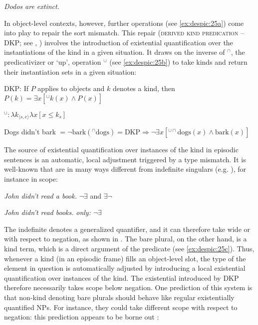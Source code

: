\documentclass[output=paper,
modfonts
]{langscibook}
\begin{document}
	\ea \label{ex:despic:24}
	\textit{Dodos are extinct.} 
	\z 
	
	In object-level contexts, however, further operations (see \ref{ex:despic:25a}) come into play to repair the sort mismatch. This repair (\textsc{derived kind predication} -- DKP; see \citealt[364]{Chierchia1998}, \citealt[399]{Dayal2004}) involves the introduction of existential quantification over the instantiations of the kind in a given situation. It draws on the inverse of $^\cap$, the predicativizer or `up', operation $^\cup$ (see \ref{ex:despic:25b}) to take kinds and return their instantiation sets in a given situation:
	
	\ea \label{ex:despic:25}
	\ea \label{ex:despic:25a}
	DKP: If $P$ applies to objects and $k$ denotes a kind, then $P(k)=\exists x[^\cup k(x)\wedge P(x)]$
	
	\ex \label{ex:despic:25b}
	$^\cup: \lambda k_{\langle s,e\rangle}\lambda x[x\leq k_s]$ 
	
	\ex \label{ex:despic:25c}
	Dogs didn't bark $=\neg\textrm{bark}(^\cap \textrm{dogs})=\textrm{DKP}\Rightarrow\neg\exists x[^{\cup\cap}\textrm{dogs}(x)\wedge\textrm{bark}(x)]$
	
	\z 
	\z 
	
	The source of existential quantification over instances of the kind in episodic sentences is an automatic, local adjustment triggered by a type mismatch. It is well-known that  are in many ways different from indefinite singulars (e.g. \citealt{Carlson1977}), for instance in scope:
	
	\ea \label{ex:despic:26}
	\ea \label{ex:despic:26a}
	\textit{John didn't read a book.} \hfill$\neg\exists$ and $\exists\neg$\hspace{75pt}
	
	\ex \label{ex:despic:26b}
	\textit{John didn't read books.} \hfill\textit{only:} $\neg\exists$\hspace{75pt} 
	
	\z 
	\z 
	
	The indefinite denotes a generalized quantifier, and it can therefore take wide or  with respect to negation, as shown in . The bare plural, on the other hand, is a kind term, which is a direct argument of the predicate (see \ref{ex:despic:25c}). Thus, whenever a kind (in an episodic
	frame) fills an object-level slot, the type of the element in question is automatically adjusted by introducing a local existential quantification over instances of the kind. The existential introduced by DKP therefore necessarily takes scope below negation. One prediction of this system is that non-kind denoting bare plurals should behave like regular existentially quantified
	NPs. For instance, they could take different scope with respect to negation: this prediction appears to be borne out \citep{Carlson1977, Chierchia1998}:
	
\end{document}
